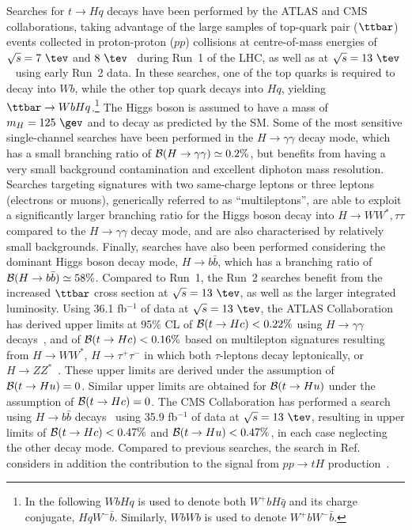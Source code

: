 Searches for $t \to Hq$ decays have been performed by the ATLAS and CMS collaborations, taking advantage of the large samples
of top-quark pair ($\ttbar$) events collected in proton-proton ($pp$) collisions at centre-of-mass energies of $\sqrt{s}=7~\tev$ and $8~\tev$~\cite{Aad:2014dya,Aad:2015pja,Khachatryan:2016atv} during Run~1 of the LHC, as well as at $\sqrt{s}=13~\tev$~\cite{Aaboud:2017mfd,Aaboud:2018pob,Sirunyan:2017uae} using early Run~2 data.
In these searches, one of the top quarks is required to decay into $Wb$, while the other top quark decays into $Hq$, yielding $\ttbar \to WbHq$.\footnote{ 
In the following $WbHq$ is used to denote both $W^+b H\bar{q}$ and its charge conjugate, $HqW^- \bar{b}$. Similarly, 
$WbWb$ is used to denote $W^+b W^- \bar{b}$.}  The Higgs boson is assumed to have a mass of $m_H=125~\gev$ and to decay as predicted by
the SM. Some of the most sensitive single-channel searches have been performed in the $H\to\gamma\gamma$ decay mode, which
has a small branching ratio of $\mathcal{B}(H\to \gamma\gamma)\simeq 0.2\%$, but benefits from having a very small background contamination 
and excellent diphoton mass re\-so\-lu\-tion. 
Searches targeting signatures with two same-charge leptons or three leptons (electrons or muons), generically referred to as ``multileptons'',
are able to exploit a significantly larger branching ratio for the Higgs 
boson decay into $H \to WW^*, \tau\tau$ compared to the $H\to\gamma\gamma$ decay mode, and are also characterised by relatively small backgrounds.
Finally, searches have also been performed considering the dominant Higgs boson decay mode, $H\to b\bar{b}$, which has a branching ratio 
of $\mathcal{B}(H\to b\bar{b})\simeq 58\%$. Compared to Run~1, the Run~2 searches benefit from the increased $\ttbar$ cross section at $\sqrt{s}=13~\tev$, 
as well as the larger integrated luminosity.
Using 36.1 fb$^{-1}$ of data at $\sqrt{s}=13~\tev$, the ATLAS Collaboration has derived upper limits at 95\% CL of  
$\mathcal{B}(t\to Hc)<0.22\%$ using $H\to \gamma\gamma$ decays~\cite{Aaboud:2017mfd}, and of $\mathcal{B}(t\to Hc)<0.16\%$ based on
multilepton signatures resulting from 
$H \to WW^*$, $H\to \tau^+\tau^-$ in which both $\tau$-leptons decay leptonically, or $H \to ZZ^*$~\cite{Aaboud:2018pob}.
These upper limits are derived under the assumption of $\mathcal{B}(t\to Hu)=0$. Similar upper limits are obtained for $\mathcal{B}(t\to Hu)$ under the
assumption of $\mathcal{B}(t\to Hc)=0$. The CMS Collaboration has performed a search using  
$H\to b\bar{b}$ decays~\cite{Sirunyan:2017uae} using 35.9 fb$^{-1}$ of data at $\sqrt{s}=13~\tev$, resulting 
in upper limits of $\mathcal{B}(t\to Hc)<0.47\%$ and $\mathcal{B}(t\to Hu)<0.47\%$, in each case neglecting the other decay mode.
Compared to previous searches, the search in Ref.~\cite{Sirunyan:2017uae} considers in addition the contribution to the signal from 
$pp \to tH$ production~\cite{Greljo:2014dka}.

